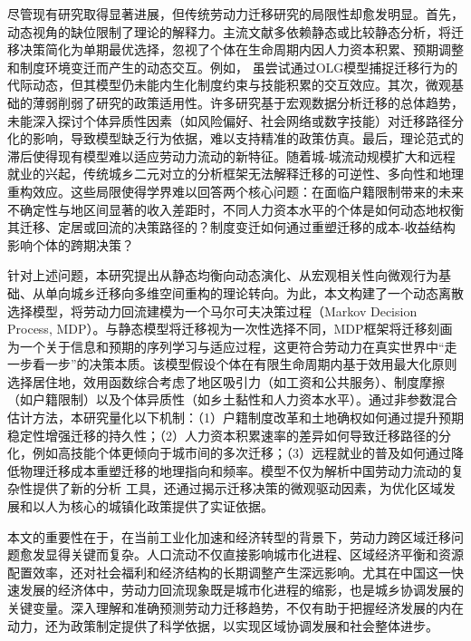 \documentclass[
  a4paper,
  zihao=-4,
  fontset=mac,
  AutoFakeBold,
  AutoFakeSlant,
  oneside]{ctexbook}
\begin{document}
尽管现有研究取得显著进展，但传统劳动力迁移研究的局限性却愈发明显。首先，动态视角的缺位限制了理论的解释力。主流文献多依赖静态或比较静态分析，将迁移决策简化为单期最优选择，忽视了个体在生命周期内因人力资本积累、预期调整和制度环境变迁而产生的动态交互。例如，
\textcite{HanQiHengNongCunLaoDongLiQianYiMoCaYingXiangNongMinGongShuLiangYuGongZiJieGouMa2018}虽尝试通过OLG模型捕捉迁移行为的代际动态，但其模型仍未能内生化制度约束与技能积累的交互效应。其次，微观基础的薄弱削弱了研究的政策适用性。许多研究基于宏观数据分析迁移的总体趋势，未能深入探讨个体异质性因素（如风险偏好、社会网络或数字技能）对迁移路径分化的影响，导致模型缺乏行为依据，难以支持精准的政策仿真。最后，理论范式的滞后使得现有模型难以适应劳动力流动的新特征。随着城-城流动规模扩大和远程就业的兴起，传统城乡二元对立的分析框架无法解释迁移的可逆性、多向性和地理重构效应。这些局限使得学界难以回答两个核心问题：在面临户籍限制带来的未来不确定性与地区间显著的收入差距时，不同人力资本水平的个体是如何动态地权衡其迁移、定居或回流的决策路径的？制度变迁如何通过重塑迁移的成本-收益结构影响个体的跨期决策？

针对上述问题，本研究提出从静态均衡向动态演化、从宏观相关性向微观行为基础、从单向城乡迁移向多维空间重构的理论转向。为此，本文构建了一个动态离散选择模型，将劳动力回流建模为一个马尔可夫决策过程（Markov Decision Process, MDP）。与静态模型将迁移视为一次性选择不同，MDP框架将迁移刻画为一个关于信息和预期的序列学习与适应过程，这更符合劳动力在真实世界中“走一步看一步”的决策本质。该模型假设个体在有限生命周期内基于效用最大化原则选择居住地，效用函数综合考虑了地区吸引力（如工资和公共服务）、制度摩擦（如户籍限制）以及个体异质性（如乡土黏性和人力资本水平）。通过非参数混合估计方法，本研究量化以下机制：（1）户籍制度改革和土地确权如何通过提升预期稳定性增强迁移的持久性；（2）人力资本积累速率的差异如何导致迁移路径的分化，例如高技能个体更倾向于城市间的多次迁移；（3）远程就业的普及如何通过降低物理迁移成本重塑迁移的地理指向和频率。模型不仅为解析中国劳动力流动的复杂性提供了新的分析 工具，还通过揭示迁移决策的微观驱动因素，为优化区域发展和以人为核心的城镇化政策提供了实证依据。

本文的重要性在于，在当前工业化加速和经济转型的背景下，劳动力跨区域迁移问题愈发显得关键而复杂。人口流动不仅直接影响城市化进程、区域经济平衡和资源配置效率，还对社会福利和经济结构的长期调整产生深远影响。尤其在中国这一快速发展的经济体中，劳动力回流现象既是城市化进程的缩影，也是城乡协调发展的关键变量。深入理解和准确预测劳动力迁移趋势，不仅有助于把握经济发展的内在动力，还为政策制定提供了科学依据，以实现区域协调发展和社会整体进步。
\end{document}
